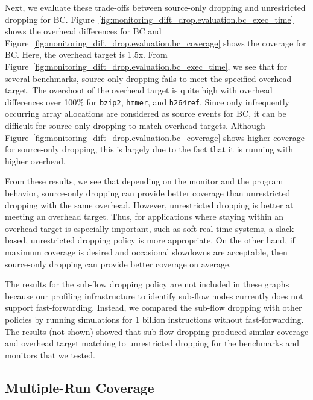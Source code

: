 Next, we evaluate these trade-offs between source-only dropping and
unrestricted dropping for BC.
Figure~\ref{fig:monitoring_dift_drop.evaluation.bc_exec_time} shows the
overhead differences for BC and
Figure~\ref{fig:monitoring_dift_drop.evaluation.bc_coverage} shows the coverage
for BC.  Here, the overhead target is 1.5x.  From
Figure~\ref{fig:monitoring_dift_drop.evaluation.bc_exec_time}, we see that for
several benchmarks, source-only dropping fails to meet the specified overhead
target.  The overshoot of the overhead target is quite high with overhead
differences over 100\% for {\tt bzip2}, {\tt hmmer}, and {\tt h264ref}.  Since
only infrequently occurring array allocations are considered as source events
for BC, it can be difficult for source-only dropping to match overhead targets.
Although Figure~\ref{fig:monitoring_dift_drop.evaluation.bc_coverage} shows
higher coverage for source-only dropping, this is largely due to the fact that
it is running with higher overhead.

From these results, we see that depending on the monitor and the program
behavior, source-only dropping can provide better coverage than unrestricted
dropping with the same overhead. However, unrestricted dropping is better at
meeting an overhead target.  Thus, for applications where staying within an
overhead target is especially important, such as soft real-time systems, a
slack-based, unrestricted dropping policy is more appropriate. On the other
hand, if maximum coverage is desired and occasional slowdowns are acceptable,
then source-only dropping can provide better coverage on average.

The results for the sub-flow dropping policy are not included in these graphs
because our profiling infrastructure to identify sub-flow nodes currently does
not support fast-forwarding. Instead, we compared the sub-flow dropping with
other policies by running simulations for 1 billion instructions without
fast-forwarding. The results (not shown) showed that sub-flow dropping produced
similar coverage and overhead target matching to unrestricted dropping for the
benchmarks and monitors that we tested.

\subsection{Multiple-Run Coverage}

